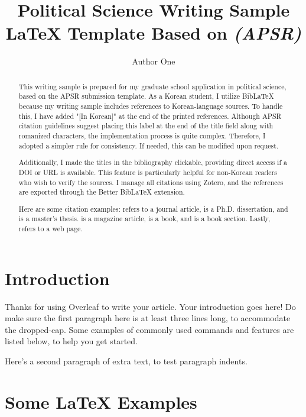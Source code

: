 \documentclass[biblatex,nonblind]{apsr_submission}
\title{Political Science Writing Sample \LaTeX{} Template Based on \emph{(APSR)}}
\author{Author One}
       {}
       {}
\begin{document}
\begin{frontmatter}
\begin{abstract}
This writing sample is prepared for my graduate school application in political science, based on the APSR submission template. As a Korean student, I utilize BibLaTeX because my writing sample includes references to Korean-language sources. To handle this, I have added "[In Korean]" at the end of the printed references. Although APSR citation guidelines suggest placing this label at the end of the title field along with romanized characters, the implementation process is quite complex. Therefore, I adopted a simpler rule for consistency. If needed, this can be modified upon request.

Additionally, I made the titles in the bibliography clickable, providing direct access if a DOI or URL is available. This feature is particularly helpful for non-Korean readers who wish to verify the sources. I manage all citations using Zotero, and the references are exported through the Better BibLaTeX extension.

Here are some citation examples: \citep{kang.lee2024} refers to a journal article, \citet{gil2019} is a Ph.D. dissertation, and \citet{kim2022} is a master’s thesis. \citet{kim2024} is a magazine article, \citet{kang2017} is a book, and \citet{gil2022} is a book section. Lastly, \citet{lee2024} refers to a web page.
\end{abstract}
\end{frontmatter}

\section{Introduction}

Thanks for using Overleaf to write your article. Your introduction goes here! Do make sure the first paragraph here is at least three lines long, to accommodate the dropped-cap. Some examples of commonly used commands and features are listed below, to help you get started.

Here's a second paragraph of extra text, to test paragraph indents.

\section{Some \LaTeX{} Examples}
\label{sec:examples}
\end{document}
